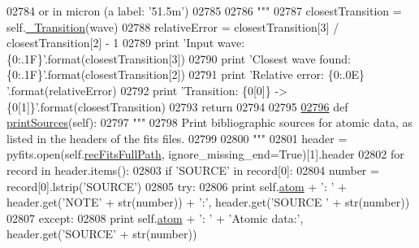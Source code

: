 \begin{DoxyCode}
{{{{{{{{{{{{{{{{{{{{{{02784 \textcolor{stringliteral}{                or in micron (a label: '51.5m')}
02785 \textcolor{stringliteral}{                }
02786 \textcolor{stringliteral}{        """}
02787         closestTransition = self.\hyperlink{classpyneb_1_1core_1_1pynebcore_1_1_rec_atom_a32b31a371f3b6ecc5bbbc4d0c5d2a855}{\_Transition}(wave)
02788         relativeError = closestTransition[3] / closestTransition[2] - 1
02789         \textcolor{keywordflow}{print} \textcolor{stringliteral}{'Input wave: \{0:.1F\}'}.format(closestTransition[3])
02790         \textcolor{keywordflow}{print} \textcolor{stringliteral}{'Closest wave found: \{0:.1F\}'}.format(closestTransition[2])
02791         \textcolor{keywordflow}{print} \textcolor{stringliteral}{'Relative error: \{0:.0E\} '}.format(relativeError)
02792         \textcolor{keywordflow}{print} \textcolor{stringliteral}{'Transition: \{0[0]\} -> \{0[1]\}'}.format(closestTransition)
02793         \textcolor{keywordflow}{return}
02794     
02795               
\hypertarget{pynebcore_8py_source_l02796}{}\hyperlink{classpyneb_1_1core_1_1pynebcore_1_1_rec_atom_a0f7e0f80b7e0057d59d61676ff5a54c0}{02796}     \textcolor{keyword}{def }\hyperlink{classpyneb_1_1core_1_1pynebcore_1_1_rec_atom_a0f7e0f80b7e0057d59d61676ff5a54c0}{printSources}(self):
02797         \textcolor{stringliteral}{"""}
02798 \textcolor{stringliteral}{        Print bibliographic sources for atomic data, as listed in the headers of the fits files.}
02799 \textcolor{stringliteral}{        }
02800 \textcolor{stringliteral}{        """}       
02801         header = pyfits.open(self.\hyperlink{classpyneb_1_1core_1_1pynebcore_1_1_rec_atom_af74fe68ebe037be119ac2f136485782b}{recFitsFullPath}, ignore\_missing\_end=\textcolor{keyword}{True})[1].header
02802         \textcolor{keywordflow}{for} record \textcolor{keywordflow}{in} header.items():
02803             \textcolor{keywordflow}{if} \textcolor{stringliteral}{'SOURCE'} \textcolor{keywordflow}{in} record[0]:
02804                 number = record[0].lstrip(\textcolor{stringliteral}{'SOURCE'})
02805                 \textcolor{keywordflow}{try}:
02806                     \textcolor{keywordflow}{print} self.\hyperlink{classpyneb_1_1core_1_1pynebcore_1_1_rec_atom_a1a2aa175da6b5b8847f409e37437e3d3}{atom} + \textcolor{stringliteral}{': '} + header.get(\textcolor{stringliteral}{'NOTE'} + str(number)) + \textcolor{stringliteral}{':'}, header.get(\textcolor{stringliteral}{'SOURCE
      '} + str(number))
02807                 \textcolor{keywordflow}{except}:
02808                     \textcolor{keywordflow}{print} self.\hyperlink{classpyneb_1_1core_1_1pynebcore_1_1_rec_atom_a1a2aa175da6b5b8847f409e37437e3d3}{atom} + \textcolor{stringliteral}{': '} + \textcolor{stringliteral}{'Atomic data:'}, header.get(\textcolor{stringliteral}{'SOURCE'} + str(number))
}}}}}}}}}}}}}}}}}}}}}}
\end{DoxyCode}
